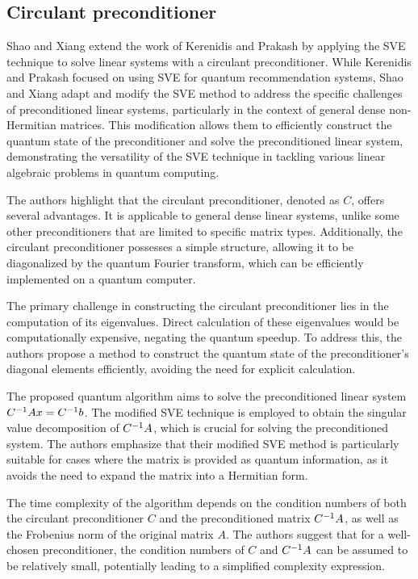 \documentclass[12pt]{extarticle}
\begin{document}
\subsection{Circulant preconditioner}


Shao and Xiang\cite{shao2018quantum} extend the work of Kerenidis and Prakash by applying the SVE technique to solve linear systems with a circulant preconditioner.
While Kerenidis and Prakash focused on using SVE for quantum recommendation systems,
Shao and Xiang adapt and modify the SVE method to address the specific challenges of preconditioned linear systems,
particularly in the context of general dense non-Hermitian matrices.
This modification allows them to efficiently construct the quantum state of the preconditioner and solve the preconditioned linear system,
demonstrating the versatility of the SVE technique in tackling various linear algebraic problems in quantum computing.

The authors highlight that the circulant preconditioner, denoted as $C$, offers several advantages.
It is applicable to general dense linear systems, unlike some other preconditioners that are limited to specific matrix types.
Additionally, the circulant preconditioner possesses a simple structure, allowing it to be diagonalized by the quantum Fourier transform, which can be efficiently implemented on a quantum computer.

The primary challenge in constructing the circulant preconditioner lies in the computation of its eigenvalues.
Direct calculation of these eigenvalues would be computationally expensive, negating the quantum speedup.
To address this, the authors propose a method to construct the quantum state of the preconditioner's diagonal elements efficiently, avoiding the need for explicit calculation.

The proposed quantum algorithm aims to solve the preconditioned linear system ${{C}^{-1}}Ax={{C}^{-1}}b$.
The modified SVE technique is employed to obtain the singular value decomposition of ${{C}^{-1}}A$, which is crucial for solving the preconditioned system.
The authors emphasize that their modified SVE method is particularly suitable for cases where the matrix is provided as quantum information, as it avoids the need to expand the matrix into a Hermitian form.

The time complexity of the algorithm depends on the condition numbers of both the circulant preconditioner $C$ and the preconditioned matrix ${{C}^{-1}}A$,
as well as the Frobenius norm of the original matrix $A$.
The authors suggest that for a well-chosen preconditioner, the condition numbers of $C$ and ${{C}^{-1}}A$ can be assumed to be relatively small, potentially leading to a simplified complexity expression.
\end{document}
